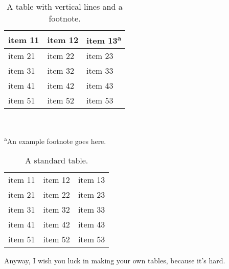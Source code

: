 \begin{table}
    \centering
    \caption{A table with vertical lines and a footnote.}
    \label{tab:1-basic-table}
\begin{tabular*}{0.87\textwidth}{ L{1in} | C{2.9in} | R{1in} }
 \hline
 item 11  & item 12  & item 13\textsuperscript{a} \T \B \\
 \hline
 item 21  & item 22  & item 23  \T \\
 item 31  & item 32  & item 33  \\
 item 41  & item 42  & item 43  \\
 item 51  & item 52  & item 53  \B \\
\hline
\end{tabular*}
\\
\raggedright{\T
\footnotesize{\textsuperscript{a}An example footnote goes here.\\
}}
\end{table}

\begin{table}
    \centering
    \caption{A standard table.}
    \label{tab:1-another-table}
\begin{tabular}{ c c c }
 \toprule
 item 11  & item 12  & item 13  \\
 item 21  & item 22  & item 23  \\
 item 31  & item 32  & item 33  \\
 item 41  & item 42  & item 43  \\
 item 51  & item 52  & item 53  \\
\bottomrule
\end{tabular}
\end{table}

Anyway, I wish you luck in making your own tables, because it's hard.